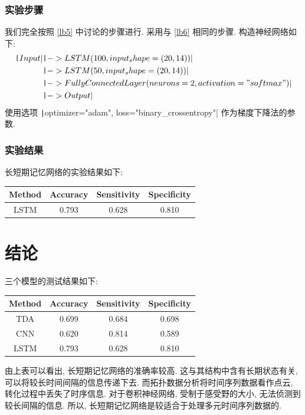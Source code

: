 \documentclass[12pt]{ctexart}
\begin{document}
\subsubsection{实验步骤}
我们完全按照 \ref{lb5} 中讨论的步骤进行. 采用与 \ref{lb6} 相同的步骤. 构造神经网络如下: 
\begin{align*}
\texttt|Input|&\texttt| -> LSTM(100,input_shape=(20,14))|\\
 &\texttt| -> LSTM(50,input_shape=(20,14))|\\
 &\texttt| -> FullyConnectedLayer(neurons=2, activation="softmax")|\\
 &\texttt| -> Output|\\
\end{align*}
使用选项 \texttt|optimizer="adam", loss="binary_crossentropy"| 作为梯度下降法的参数. 
\subsubsection{实验结果}
长短期记忆网络的实验结果如下:
\begin{table}[!htbp]
\centering
\begin{tabular}{|c|c|c|c|}
\hline
Method&Accuracy&Sensitivity&Specificity\\
\hline
LSTM&0.793& 0.628& 0.810\\
\hline
\end{tabular}
\end{table}

\section{结论}
三个模型的测试结果如下:

\begin{table}[!htbp]
\centering
\begin{tabular}{|c|c|c|c|}
\hline
Method&Accuracy&Sensitivity&Specificity\\
\hline
TDA&0.699& 0.684& 0.698\\
\hline
CNN&0.620& 0.814& 0.589\\
\hline
LSTM&0.793& 0.628& 0.810\\
\hline
\end{tabular}
\end{table}

由上表可以看出, 长短期记忆网络的准确率较高. 这与其结构中含有长期状态有关, 可以将较长时间间隔的信息传递下去. 而拓扑数据分析将时间序列数据看作点云, 转化过程中丢失了时序信息. 对于卷积神经网络, 受制于感受野的大小, 无法侦测到较长间隔的信息. 所以, 长短期记忆网络是较适合于处理多元时间序列数据的.
\end{document}
